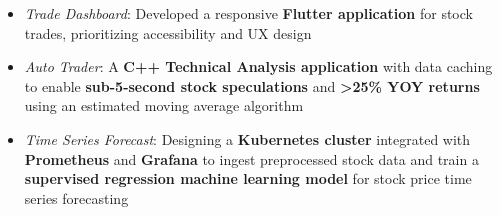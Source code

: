 \begin{itemize}
  \item \textit{Trade Dashboard}: Developed a responsive \textbf{Flutter application} for stock trades, prioritizing accessibility and UX design
  \item \textit{Auto Trader}: A \textbf{C++ Technical Analysis application} with data caching to enable \textbf{sub-5-second stock speculations} and \textbf{\textgreater{}25\% YOY returns} using an estimated moving average algorithm
  \item \textit{Time Series Forecast}: Designing a \textbf{Kubernetes cluster} integrated with \textbf{Prometheus} and \textbf{Grafana} to ingest preprocessed stock data and train a \textbf{supervised regression machine learning model} for stock price time series forecasting
\end{itemize}